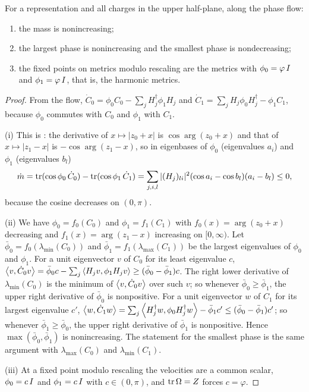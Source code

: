 \begin{proposition}\label{prop:representations}
For a representation and all charges in the upper half-plane, along the phase
flow:
\begin{enumerate}
\item[(i)] the mass is nonincreasing;
\item[(ii)] the largest phase is nonincreasing and the smallest phase is
 nondecreasing;
\item[(iii)] the fixed points on metrics modulo rescaling are the metrics
 with $\phi_0=\varphi\,I$ and $\phi_1=\varphi\,I$, that is, the harmonic
 metrics.
\end{enumerate}
\end{proposition}

\begin{proof}
From the flow,
$\dot C_0=\phi_0C_0-\sum_jH_j^\dagger\phi_1H_j$ and
$\dot C_1=\sum_jH_j\phi_0H_j^\dagger-\phi_1C_1$, because $\phi_0$ commutes with
$C_0$ and $\phi_1$ with $C_1$.

(i) This is \cite[\S6.2]{wue26}: the derivative of $x\mapsto|z_0+x|$ is
$\cos\arg(z_0+x)$ and that of $x\mapsto|z_1-x|$ is $-\cos\arg(z_1-x)$, so in
eigenbases of $\phi_0$ (eigenvalues $a_i$) and $\phi_1$ (eigenvalues $b_l$)
\[
 \dot m=\operatorname{tr}(\cos\phi_0\,\dot C_0)-\operatorname{tr}(\cos\phi_1\,\dot C_1)
 =\sum_{j,i,l}|(H_j)_{li}|^2(\cos a_i-\cos b_l)(a_i-b_l)\leq0,
\]
because the cosine decreases on $(0,\pi)$.

(ii) We have $\phi_0=f_0(C_0)$ and $\phi_1=f_1(C_1)$ with
$f_0(x)=\arg(z_0+x)$ decreasing and $f_1(x)=\arg(z_1-x)$ increasing on
$[0,\infty)$. Let $\bar\phi_0=f_0(\lambda_{\min}(C_0))$ and
$\bar\phi_1=f_1(\lambda_{\max}(C_1))$ be the largest eigenvalues of $\phi_0$
and $\phi_1$. For a unit eigenvector $v$ of $C_0$ for its least eigenvalue
$c$,
$\left\langle v,\dot C_0v\right\rangle=\bar\phi_0c-\sum_j\left\langle H_jv,\phi_1H_jv\right\rangle
\geq(\bar\phi_0-\bar\phi_1)c$. The right lower derivative of
$\lambda_{\min}(C_0)$ is the minimum of $\left\langle v,\dot C_0v\right\rangle$ over such $v$;
so whenever $\bar\phi_0\geq\bar\phi_1$, the upper right derivative of
$\bar\phi_0$ is nonpositive. For a unit eigenvector $w$ of $C_1$ for its
largest eigenvalue $c'$,
$\left\langle w,\dot C_1w\right\rangle=\sum_j\left\langle H_j^\dagger w,\phi_0H_j^\dagger w\right\rangle-\bar\phi_1c'
\leq(\bar\phi_0-\bar\phi_1)c'$; so whenever $\bar\phi_1\geq\bar\phi_0$, the
upper right derivative of $\bar\phi_1$ is nonpositive. Hence
$\max(\bar\phi_0,\bar\phi_1)$ is nonincreasing. The statement for the
smallest phase is the same argument with $\lambda_{\max}(C_0)$ and
$\lambda_{\min}(C_1)$.

(iii) At a fixed point modulo rescaling the velocities are a common scalar,
$\phi_0=c\,I$ and $\phi_1=c\,I$ with $c\in(0,\pi)$, and
$\operatorname{tr}\Omega=Z$ forces $c=\varphi$.
\end{proof}

